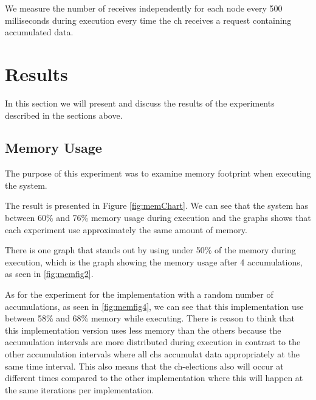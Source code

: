 \documentclass[USenglish]{uit-thesis}
\begin{document}
We measure the number of receives independently for each node every 500 milliseconds during execution every time the \gls{ch} receives a request containing accumulated data.


\newpage

\section{Results}

In this section we will present and discuss the results of the experiments described in the sections above.

\subsection{Memory Usage}

The purpose of this experiment was to examine memory footprint when executing the system.

The result is presented in Figure \ref{fig:memChart}. We can see that the system has between 60\% and 76\% memory usage during execution and the graphs shows that each experiment use approximately the same amount of memory.

There is one graph that stands out by using under 50\% of the memory during execution, which is the graph showing the memory usage after 4 accumulations, as seen in \autoref{fig:memfig2}.

As for the experiment for the implementation with a random number of accumulations, as seen in \autoref{fig:memfig4}, we can see that this implementation use between 58\% and 68\% memory while executing. There is reason to think that this implementation version uses less memory than the others because the accumulation intervals are more distributed during execution in contrast to the other accumulation intervals where all \glspl{ch} accumulat data appropriately at the same time interval. This also means that the \gls{ch}-elections also will occur at different times  compared to the other implementation where this will happen at the same iterations per implementation. 

\end{document}
